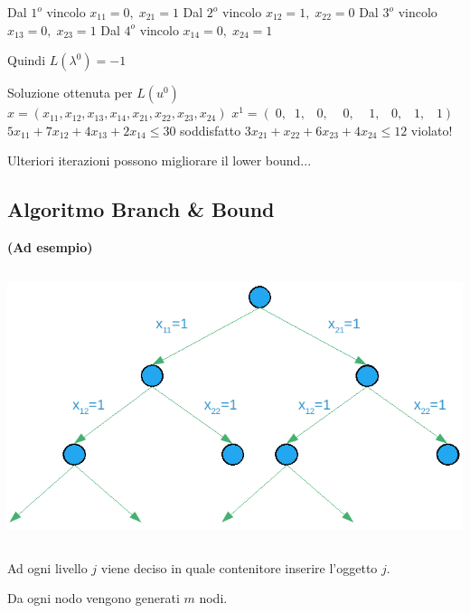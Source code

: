 Dal $1^{o}$ vincolo $x_{11}=0,\;x_{21}=1$\newline
Dal $2^{o}$ vincolo $x_{12}=1,\;x_{22}=0$\newline
Dal $3^{o}$ vincolo $x_{13}=0,\;x_{23}=1$\newline
Dal $4^{o}$ vincolo $x_{14}=0,\;x_{24}=1$\newline

Quindi $L(\lambda^{0})=-1$

Soluzione ottenuta per $L(u^{0})$\\
$x=(x_{11},x_{12},x_{13},x_{14},x_{21},x_{22},x_{23},x_{24})$\newline
$x^{1}=(\;0,\;\;1,\;\;\;0,\;\;\;\;0,\;\;\;\;1,\;\;\;0,\;\;\;1,\;\;\;1)$\newline\newline
$5x_{11}+7x_{12}+4x_{13}+2x_{14}\le 30$ soddisfatto\newline
$3x_{21}+x_{22}+6x_{23}+4x_{24}\le 12$ violato!

Ulteriori iterazioni possono migliorare il lower bound...

\subsection{Algoritmo Branch \& Bound}
\textbf{(Ad esempio)}

\centerline{\includegraphics[height=8cm]{images/graph26.png}}
Ad ogni livello $j$ viene deciso in quale contenitore inserire l'oggetto $j$.

Da ogni nodo vengono generati $m$ nodi.